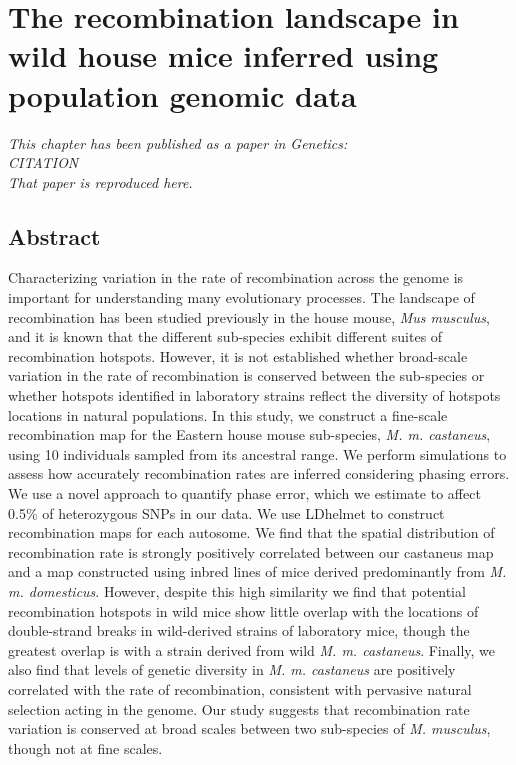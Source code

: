 \chapter{The recombination landscape in wild house mice inferred using population genomic data}

\emph{This chapter has been published as a paper in Genetics: \\CITATION\\That paper is reproduced here.}
\section{Abstract}
Characterizing variation in the rate of recombination across the genome is important for understanding many evolutionary processes. The landscape of recombination has been studied previously in the house mouse, \emph{Mus musculus}, and it is known that the different sub-species exhibit different suites of recombination hotspots. However, it is not established whether broad-scale variation in the rate of recombination is conserved between the sub-species or whether hotspots identified in laboratory strains reflect the diversity of hotspots locations in natural populations. In this study, we construct a fine-scale recombination map for the Eastern house mouse sub-species, \emph{M. m. castaneus}, using 10 individuals sampled from its ancestral range. We perform simulations to assess how accurately recombination rates are inferred considering phasing errors. We use a novel approach to quantify phase error, which we estimate to affect 0.5\% of heterozygous SNPs in our data. We use LDhelmet to construct recombination maps for each autosome. We find that the spatial distribution of recombination rate is strongly positively correlated between our castaneus map and a map constructed using inbred lines of mice derived predominantly from \emph{M. m. domesticus}. However, despite this high similarity we find that potential recombination hotspots in wild mice show little overlap with the locations of double-strand breaks in wild-derived strains of laboratory mice, though the greatest overlap is with a strain derived from wild \emph{M. m. castaneus}. Finally, we also find that levels of genetic diversity in \emph{M. m. castaneus} are positively correlated with the rate of recombination, consistent with pervasive natural selection acting in the genome. Our study suggests that recombination rate variation is conserved at broad scales between two sub-species of \emph{M. musculus}, though not at fine scales.

